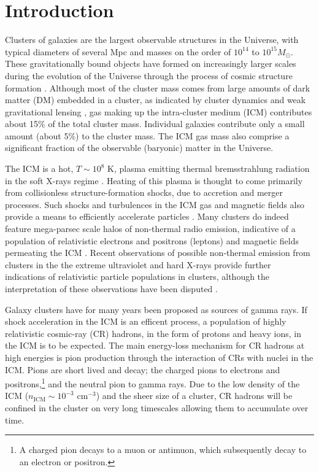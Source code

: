 \documentclass[12pt,manuscript]{aastex}
\begin{document}
\section{Introduction}
Clusters of galaxies are the largest observable structures in the Universe, with typical diameters of several Mpc and masses on the order of $10^{14}$ to $10^{15} M_{\odot}$. These gravitationally bound objects have formed on increasingly larger scales during the evolution of the Universe through the process of cosmic structure formation \citep{article:Voit:2005}. Although most of the cluster mass comes from large amounts of dark matter (DM) embedded in a cluster, as indicated by cluster dynamics and weak gravitational lensing \citep[][]{article:DiaferioSchindlerDolag:2008}, gas making up the intra-cluster medium (ICM) contributes about 15\% of the total cluster mass. Individual galaxies contribute only a small amount (about 5\%) to the cluster mass. The ICM gas mass also comprise a significant fraction of the observable (baryonic) matter in the Universe.

The ICM is a hot, $T\sim 10^{8}$ K, plasma emitting thermal bremsstrahlung radiation in the soft X-rays regime \citep[see, e.g.][]{article:Petrosian:2001}. Heating of this plasma is thought to come primarily from collisionless structure-formation shocks, due to accretion and merger processes. Such shocks and turbulences in the ICM gas and magnetic fields also provide a means to efficiently accelerate particles \citep[see, e.g.,][]{article:ColafrancescoBlasi:1998, article:Ryu_etal:2003}. Many clusters do indeed feature mega-parsec scale halos of non-thermal radio emission, indicative of a population of relativistic electrons and positrons (leptons) and magnetic fields permeating the ICM \citep{article:Cassano_etal:2010}. Recent observations of possible non-thermal emission from clusters in the the extreme ultraviolet \citep[EUV; ][]{article:SarazinLieu:1998} and hard X-rays \citep{article:RephaeliGruber:2002, article:Fusco-Femiano_etal:2004, article:Eckert_etal:2007} provide further indications of relativistic particle populations in clusters, although the interpretation of these observations have been disputed \citep[see, e.g.][]{article:Wik_etal:2009}.

Galaxy clusters have for many years been proposed as sources of gamma rays. If shock acceleration in the ICM is an efficent process, a population of highly relativistic cosmic-ray (CR) hadrons, in the form of protons and heavy ions, in the ICM is to be expected. The main energy-loss mechanism for CR hadrons at high energies is pion production through the interaction of CRs with nuclei in the ICM. Pions are short lived and decay; the charged pions to electrons and positrons,\footnote{A charged pion decays to a muon or antimuon, which subsequently decay to an electron or positron.} and the neutral pion to gamma rays. Due to the low density of the ICM ($n_{\mathrm{ICM}}\sim 10^{-3}$ cm$^{-3}$) and the sheer size of a cluster, CR hadrons will be confined in the cluster on very long timescales \citep[][]{article:Volk_etal:1996, article:Berezinsky_etal:1997} allowing them to accumulate over time. 
\end{document}
